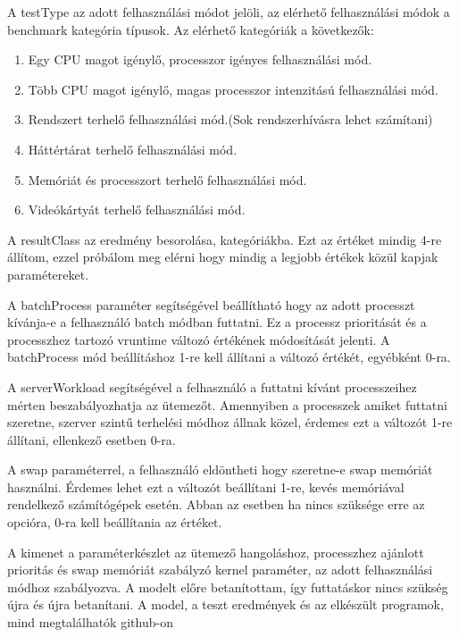 A testType az adott felhasználási módot jelöli, az elérhető felhasználási módok a benchmark kategória típusok. Az elérhető kategóriák a következők: 
\begin{enumerate}
\item Egy CPU magot igénylő, processzor igényes felhasználási mód.
\item Több CPU magot igénylő, magas processzor intenzitású felhasználási mód.
\item Rendszert terhelő felhasználási mód.(Sok rendszerhívásra lehet számítani)
\item Háttértárat terhelő felhasználási mód.
\item Memóriát és processzort terhelő felhasználási mód.
\item Videókártyát terhelő felhasználási mód.
\end{enumerate}

A resultClass az eredmény besorolása, kategóriákba. Ezt az értéket mindig 4-re állítom, ezzel próbálom meg elérni hogy mindig a legjobb értékek közül kapjak paramétereket.

A batchProcess paraméter segítségével beállítható hogy az adott processzt kívánja-e a felhasználó batch módban futtatni. Ez a processz prioritását és a processzhez tartozó vruntime változó értékének módosítását jelenti. A batchProcess mód beállításhoz 1-re kell állítani a változó értékét, egyébként 0-ra.

A serverWorkload segítségével a felhasználó a futtatni kívánt processzeihez mérten beszabályozhatja az ütemezőt. Amennyiben a processzek amiket futtatni szeretne, szerver szintű terhelési módhoz állnak közel, érdemes ezt a változót 1-re állítani, ellenkező esetben 0-ra.

A swap paraméterrel, a felhasználó eldöntheti hogy szeretne-e swap memóriát használni. Érdemes lehet ezt a változót beállítani 1-re, kevés memóriával rendelkező számítógépek esetén. Abban az esetben ha nincs szüksége erre az opcióra, 0-ra kell beállítania az értéket.

A kimenet a paraméterkészlet az ütemező hangoláshoz, processzhez ajánlott prioritás és swap memóriát szabályzó kernel paraméter, az adott felhasználási módhoz szabályozva.
A modelt előre betanítottam, így futtatáskor nincs szükség újra és újra betanítani. A model, a teszt eredmények és az elkészült programok, mind megtalálhatók github-on